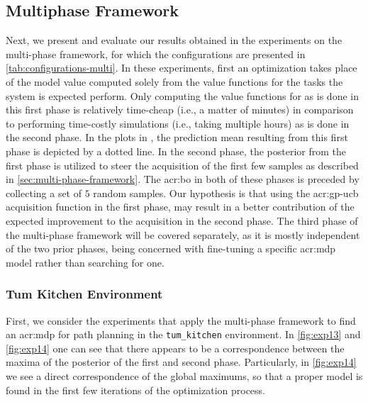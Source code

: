 \newpage

\subsection{Multiphase Framework}
\label{sec:multiphase-framework-results}

Next, we present and evaluate our results obtained in the experiments on the multi-phase framework, for which the configurations are presented in \autoref{tab:configurations-multi}.
In these experiments, first an optimization takes place of the model value computed solely from the value functions for the tasks the system is expected perform.
Only computing the value functions for  as is done in this first phase is relatively time-cheap (i.e., a matter of minutes) in comparison to performing time-costly simulations (i.e., taking multiple hours) as is done in the second phase.
In the plots in , the prediction mean resulting from this first phase is depicted by a dotted line.
In the second phase, the posterior from the first phase is utilized to steer the acquisition of the first few samples as described in \autoref{sec:multi-phase-framework}.
The \acrshort{acr:bo} in both of these phases is preceded by collecting a set of $5$ random samples.
Our hypothesis is that using the \acrshort{acr:gp-ucb} acquisition function in the first phase, may result in a better contribution of the expected improvement to the acquisition in the second phase.
The third phase of the multi-phase framework will be covered separately, as it is mostly independent of the two prior phases, being concerned with fine-tuning a specific \acrshort{acr:mdp} model rather than searching for one.

\subsubsection{Tum Kitchen Environment}
First, we consider the experiments that apply the multi-phase framework to find an \acrshort{acr:mdp} for path planning in the \texttt{tum\_kitchen} environment.
In \autoref{fig:exp13} and \autoref{fig:exp14} one can see that there appears to be a correspondence between the maxima of the posterior of the first and second phase.
Particularly, in \autoref{fig:exp14} we see a direct correspondence of the global maximums, so that a proper model is found in the first few iterations of the optimization process.

